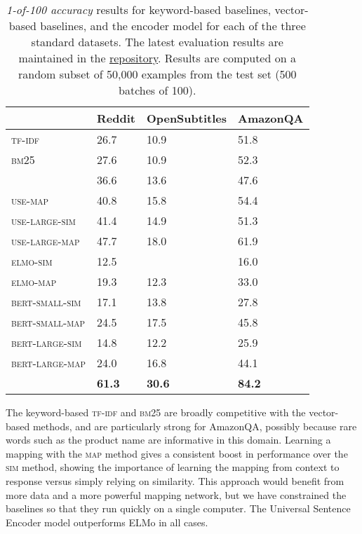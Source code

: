 \documentclass[11pt,a4paper,table]{article}
\renewcommand*{\arraystretch}{1.5}
\newcommand\encoder{polyai-encoder}
\newcommand\encoder{encoder}
\begin{document}
\begin{table*}[htb]

\begingroup
\renewcommand*{\arraystretch}{1.2}

\centering
{}
\begin{tabularx}{0.85 \linewidth}{l YYY}
\toprule
{} & {{Reddit}} & {{OpenSubtitles}} &  {{AmazonQA}}  \\ \midrule
{\textsc{tf-idf}} &          {26.7} & {10.9} & {51.8}  \\
{\textsc{bm25}} &            {27.6} & {10.9} & {52.3}  \\
\hdashline

 & {36.6} & {13.6} & {47.6} \\
{\textsc{use-map}} &         {40.8} & {15.8} & {54.4} \\
{\textsc{use-large-sim}} &   {41.4} & {14.9} & {51.3} \\
{\textsc{use-large-map}} &   {47.7} & {18.0} & {61.9} \\
{\textsc{elmo-sim}} &        {12.5} &   & {16.0} \\
{\textsc{elmo-map}} &        {19.3} & {12.3} & {33.0} \\
{\textsc{bert-small-sim}} &  {17.1}    & {13.8} & {27.8} \\
{\textsc{bert-small-map}} & {24.5}     & {17.5}& {45.8}\\
{\textsc{bert-large-sim}} & {14.8}     & {12.2}& {25.9}\\
{\textsc{bert-large-map}} & {24.0}     & {16.8}&{44.1} \\

\hdashline

\addlinespace[1ex] {\textsc{\encoder}}    & \textbf{61.3} & \textbf{30.6} & \textbf{84.2}  \\
\bottomrule
\end{tabularx}
\vspace{1em}
\caption{
    \emph{1-of-100 accuracy} results for keyword-based baselines, vector-based baselines, and the encoder model for each of the three standard datasets. The latest evaluation results are maintained in the \href{https://github.com/PolyAI-LDN/conversational-datasets/blob/master/BENCHMARKS.md}{repository}. Results are computed on a random subset of 50,000 examples from the test set (500 batches of 100).
}
\label{tab:evaluation}
\endgroup
\end{table*}

The keyword-based \textsc{tf-idf} and \textsc{bm25} are broadly competitive with the vector-based methods, and are particularly strong for AmazonQA, possibly because rare words such as the product name are informative in this domain. Learning a mapping with the \textsc{map} method gives a consistent boost in performance over the \textsc{sim} method, showing the importance of learning the mapping from context to response versus simply relying on similarity. This approach would benefit from more data and a more powerful mapping network, but we have constrained the baselines so that they run quickly on a single computer. The Universal Sentence Encoder model outperforms ELMo in all cases.
\end{document}

